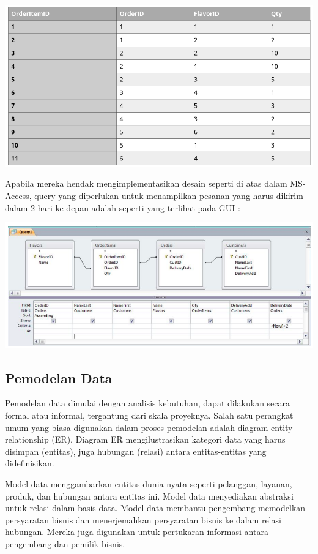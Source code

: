 \documentclass[]{book}
\begin{document}
\includegraphics{./img/tab7_order.png}

Apabila mereka hendak mengimplementasikan desain seperti di atas dalam MS-Access, query yang diperlukan untuk menampilkan pesanan yang harus dikirim dalam 2 hari ke depan adalah seperti yang terlihat pada GUI :

\includegraphics{./img/tab8_order.png}

\hypertarget{pemodelan-data}{%
\subsection{Pemodelan Data}\label{pemodelan-data}}

Pemodelan data dimulai dengan analisis kebutuhan, dapat dilakukan secara formal atau informal, tergantung dari skala proyeknya. Salah satu perangkat umum yang biasa digunakan dalam proses pemodelan adalah diagram entity-relationship (ER). Diagram ER mengilustrasikan kategori data yang harus disimpan (entitas), juga hubungan (relasi) antara entitas-entitas yang didefinisikan.

Model data menggambarkan entitas dunia nyata seperti pelanggan, layanan, produk, dan hubungan antara entitas ini. Model data menyediakan abstraksi untuk relasi dalam basis data. Model data membantu pengembang memodelkan persyaratan bisnis dan menerjemahkan persyaratan bisnis ke dalam relasi hubungan. Mereka juga digunakan untuk pertukaran informasi antara pengembang dan pemilik bisnis.
\end{document}
